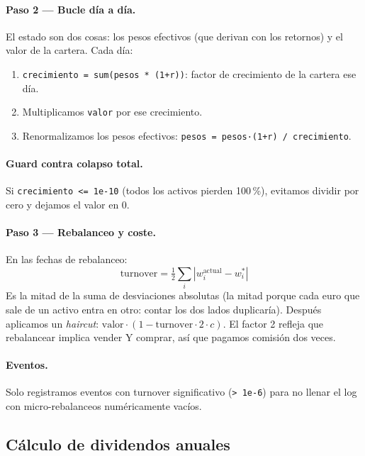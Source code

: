 \documentclass[11pt,a4paper]{book}
\begin{document}
\paragraph{Paso 2 --- Bucle día a día.} El estado son dos cosas: los pesos efectivos (que derivan con los retornos) y el valor de la cartera. Cada día:
\begin{enumerate}
  \item \texttt{crecimiento = sum(pesos * (1+r))}: factor de crecimiento de la cartera ese día.
  \item Multiplicamos \texttt{valor} por ese crecimiento.
  \item Renormalizamos los pesos efectivos: \texttt{pesos = pesos·(1+r) / crecimiento}.
\end{enumerate}

\paragraph{Guard contra colapso total.} Si \texttt{crecimiento <= 1e-10} (todos los activos pierden 100\,\%), evitamos dividir por cero y dejamos el valor en 0.

\paragraph{Paso 3 --- Rebalanceo y coste.} En las fechas de rebalanceo:
\[ \mathrm{turnover} = \tfrac{1}{2}\sum_i |w_i^{\mathrm{actual}} - w_i^*| \]
Es la mitad de la suma de desviaciones absolutas (la mitad porque cada euro que sale de un activo entra en otro: contar los dos lados duplicaría). Después aplicamos un \emph{haircut}: $\text{valor} \cdot (1 - \mathrm{turnover} \cdot 2 \cdot c)$. El factor 2 refleja que rebalancear implica vender Y comprar, así que pagamos comisión dos veces.

\paragraph{Eventos.} Solo registramos eventos con turnover significativo (\texttt{> 1e-6}) para no llenar el log con micro-rebalanceos numéricamente vacíos.

\subsection{Cálculo de dividendos anuales}
\end{document}
